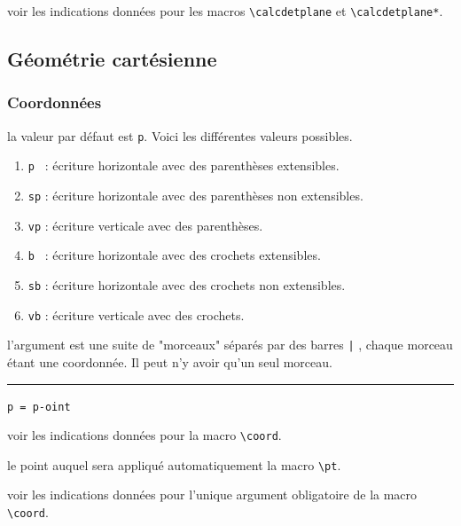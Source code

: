 \documentclass[12pt,a4paper]{book}
\newcommand\env[1]{\texttt{#1}}
\newcommand\macro[1]{\env{\textbackslash{}#1}}
\theoremstyle{definition}
\newcommand\separation{
	\medskip
	\hfill\rule{0.5\textwidth}{0.75pt}\hfill
	\medskip
}
\newcommand\mwhyprefix[2]{%
	\texttt{#1 = #1-#2}%
}
\begin{document}
{{ voir les indications données pour les macros \macro{calcdetplane} et \macro{calcdetplane*}.


\subsection{Géométrie cartésienne}

\subsubsection{Coordonnées} \label{tnsgeo-coordinates}



\label{tnsgeo-coordinates-tech}



\IDoption{} la valeur par défaut est \verb+p+. Voici les différentes valeurs possibles.
\begin{enumerate}
	\item \verb+p + : écriture horizontale avec des parenthèses extensibles.

	\item \verb+sp+ : écriture horizontale avec des parenthèses non extensibles.

	\item \verb+vp+ : écriture verticale avec des parenthèses.

	\item \verb+b + : écriture horizontale avec des crochets extensibles.

	\item \verb+sb+ : écriture horizontale avec des crochets non extensibles.

	\item \verb+vb+ : écriture verticale avec des crochets.
\end{enumerate}


\IDarg{} l'argument est une suite de "morceaux" séparés par des barres \verb+|+ , chaque morceau étant une coordonnée. Il peut n'y avoir qu'un seul morceau.


\separation


 \hfill \mwhyprefix{p}{oint}

\IDoption{} voir les indications données pour la macro \macro{coord}.

 le point auquel sera appliqué automatiquement la macro \macro{pt}.

 voir les indications données pour l'unique argument obligatoire de la macro \macro{coord}.


}}
\end{document}
